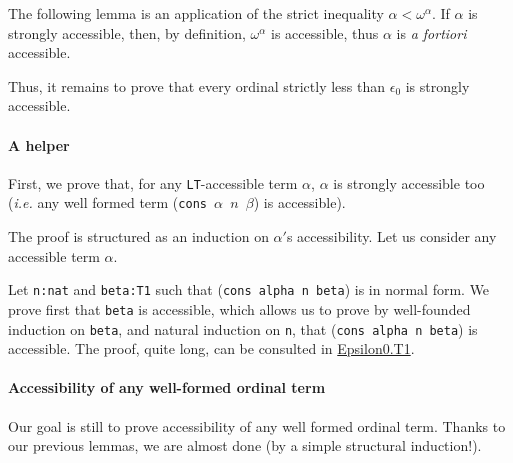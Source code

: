 


The following lemma is an application of the strict inequality 
$\alpha < \omega ^\alpha$. If $\alpha$ is strongly accessible, then, by definition,
$\omega^\alpha$ is accessible, thus $\alpha$ is \emph{a fortiori} accessible.




Thus, it remains to prove that every ordinal strictly less than $\epsilon_0$
is strongly accessible.


\label{sec:orgheadline81}
\label{proof-wf-epsilon0}
\paragraph{A helper}
\label{sec:orgheadline79}

First, we prove that, for  any \texttt{LT}-accessible term $\alpha$, $\alpha$ is 
strongly accessible too (\emph{i.e.} any well formed
term (\texttt{cons $\alpha$ $n$ $\beta$})  is accessible).

The proof is structured as an induction on $\alpha'$s accessibility. Let us consider
any  accessible term $\alpha$.





Let \texttt{n:nat} and \texttt{beta:T1} such that (\texttt{cons alpha n beta}) is in normal form. 
We prove first that \texttt{beta} is accessible,  which allows us to prove by well-founded induction on \texttt{beta}, 
and natural induction on \texttt{n}, that (\texttt{cons alpha n beta}) is accessible.
The proof, quite long, can be consulted in \href{../theories/html/hydras.Epsilon0.T1.html}{Epsilon0.T1}.

\paragraph{Accessibility of any well-formed ordinal term}
\label{sec:orgheadline80}

Our goal is still to prove accessibility of any well formed ordinal term.
Thanks to our previous lemmas, we are almost done (by a simple structural induction!).

